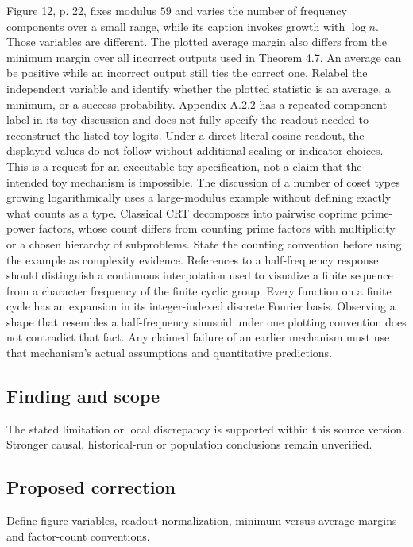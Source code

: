 \documentclass[11pt]{article}
\begin{document}
Figure 12, p. 22, fixes modulus \(59\) and varies the number of frequency components over a small range, while its caption invokes growth with \(\log n\). Those variables are different. The plotted average margin also differs from the minimum margin over all incorrect outputs used in Theorem 4.7. An average can be positive while an incorrect output still ties the correct one. Relabel the independent variable and identify whether the plotted statistic is an average, a minimum, or a success probability. Appendix A.2.2 has a repeated component label in its toy discussion and does not fully specify the readout needed to reconstruct the listed toy logits. Under a direct literal cosine readout, the displayed values do not follow without additional scaling or indicator choices. This is a request for an executable toy specification, not a claim that the intended toy mechanism is impossible. The discussion of a number of coset types growing logarithmically uses a large-modulus example without defining exactly what counts as a type. Classical CRT decomposes into pairwise coprime prime-power factors, whose count differs from counting prime factors with multiplicity or a chosen hierarchy of subproblems. State the counting convention before using the example as complexity evidence. References to a half-frequency response should distinguish a continuous interpolation used to visualize a finite sequence from a character frequency of the finite cyclic group. Every function on a finite cycle has an expansion in its integer-indexed discrete Fourier basis. Observing a shape that resembles a half-frequency sinusoid under one plotting convention does not contradict that fact. Any claimed failure of an earlier mechanism must use that mechanism's actual assumptions and quantitative predictions.

\subsection*{Finding and scope}

The stated limitation or local discrepancy is supported within this source version. Stronger causal, historical-run or population conclusions remain unverified.

\subsection*{Proposed correction}

Define figure variables, readout normalization, minimum-versus-average margins and factor-count conventions.
\end{document}
